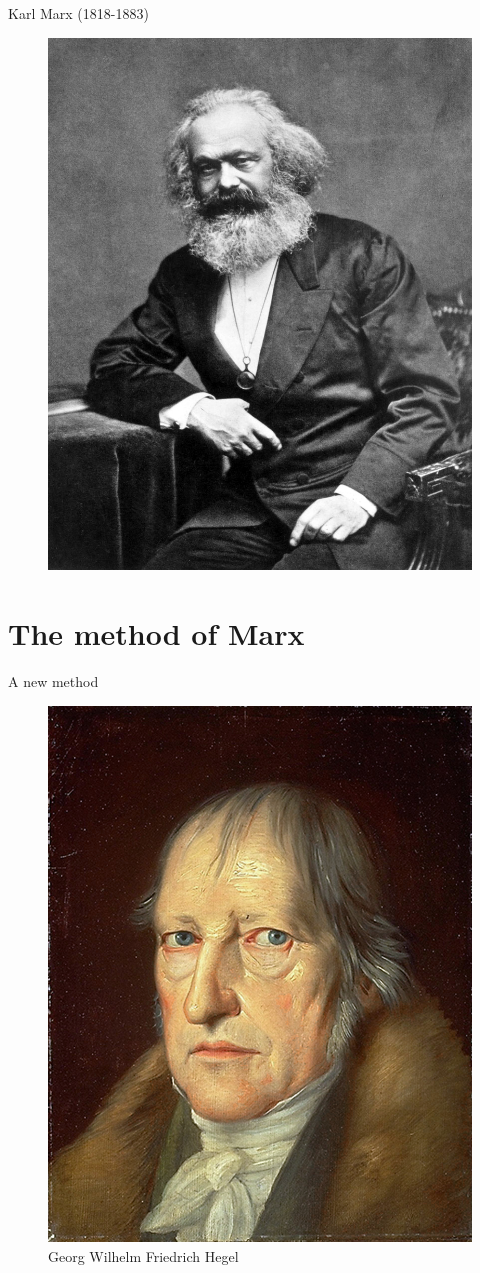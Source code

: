 \documentclass{beamer}
\begin{document}
\begin{frame}{Karl Marx (1818-1883)}
              \begin{figure}
                \includegraphics[width=.6\textwidth]{../img/karl.png}
                \label{fig:karl}
             \end{figure}{}
\end{frame}{}

\section{The method of Marx}

\begin{frame}{A new method}
    \begin{figure}
        \centering
        \includegraphics[width=.5\textwidth]{../img/Hegel_by_Schlesinger.jpg}
        \caption{Georg Wilhelm Friedrich Hegel}
        \label{fig:hegel}
    \end{figure}{}
\end{frame}{}
\end{document}
